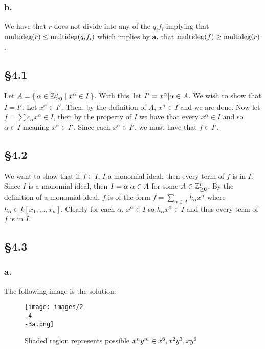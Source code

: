 \documentclass[letterpaper]{article}
\begin{document}
\subsubsection*{b.}

We have that $r$ does not divide into any of the $q_{i}f_{i}$ implying that $\operatorname{multideg}(r) \leq \operatorname{multideg}(q_{i} f_{i})$ which implies by \textbf{a.} that $\operatorname{multideg}(f) \geq \operatorname{multideg}(r)$.

\subsection*{\S 4.1}

Let $A = \set{\alpha \in \mathbb{Z}_{\geq 0}^{n} | x^{\alpha} \in I}$.
With this, let $I' = \ideal{x^{\alpha} | \alpha \in A}$.
We wish to show that $I = I'$.
Let $x^{\alpha} \in I'$.
Then, by the definition of $A$, $x^{\alpha} \in I$ and we are done.
Now let $f = \sum c_{\alpha} x^{\alpha} \in I$, then by the property of $I$ we have that every $x^{\alpha} \in I$ and so $\alpha \in I$ meaning $x^{\alpha} \in I'$.
Since each $x^{\alpha} \in I'$, we must have that $f \in I'$.

\subsection*{\S 4.2}

We want to show that if $f \in I$, $I$ a monomial ideal, then every term of $f$ is in $I$.
Since $I$ is a monomial ideal, then $I = \ideal{\alpha | \alpha \in A}$ for some $A \in \mathbb{Z}_{\geq 0}^{n}$.
By the definition of a monomial ideal, $f$ is of the form $f = \sum_{\alpha \in A} h_{\alpha} x^{\alpha}$ where $h_{\alpha} \in k[x_{1}, \ldots, x_{n}]$.
Clearly for each $\alpha$, $x^{\alpha} \in I$ so $h_{\alpha} x^{\alpha} \in I$ and thus every term of $f$ is in $I$.

\subsection*{\S 4.3}

\subsubsection*{a.}

The following image is the solution:

\begin{figure}[H]
  \centering
  \texttt{[image: images/2\\-4\\-3a.png]}
  \caption{Shaded region represents possible $x^{n}y^{m} \in \ideal{x^{6}, x^{2}y^{3}, xy^{6}}$}
\end{figure}
\end{document}
